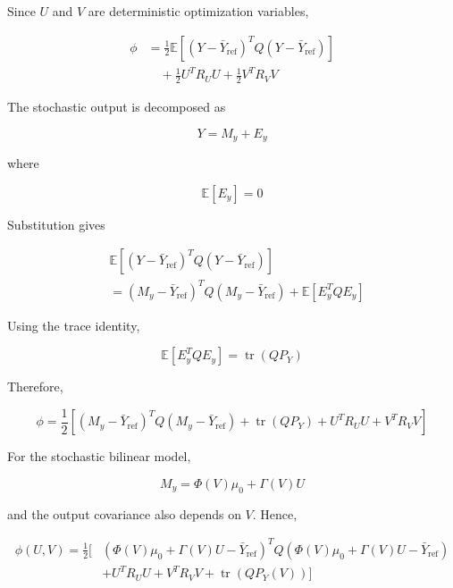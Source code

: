 Since \(U\) and \(V\) are deterministic optimization variables,

\begin{align}
    \phi
    &=
    \frac{1}{2}
    \mathbb{E}
    \left[
        (Y-\bar{Y}_{\mathrm{ref}})^T
        Q
        (Y-\bar{Y}_{\mathrm{ref}})
    \right]
    \nonumber\\
    &\quad+
    \frac{1}{2}U^TR_UU
    +
    \frac{1}{2}V^TR_VV
\end{align}

The stochastic output is decomposed as

\begin{equation}
    Y=M_y+E_y
\end{equation}

where

\begin{equation}
    \mathbb{E}[E_y]=0
\end{equation}

Substitution gives

\begin{align}
&\mathbb{E}
\left[
(Y-\bar{Y}_{\mathrm{ref}})^T
Q
(Y-\bar{Y}_{\mathrm{ref}})
\right]
\\
&=
(M_y-\bar{Y}_{\mathrm{ref}})^T
Q
(M_y-\bar{Y}_{\mathrm{ref}})
+
\mathbb{E}[E_y^TQE_y]
\end{align}

Using the trace identity,

\begin{equation}
    \mathbb{E}[E_y^TQE_y]
    =
    \operatorname{tr}
    \left(
        QP_Y
    \right)
\end{equation}

Therefore,

\begin{equation}
    \phi
    =
    \frac{1}{2}
    \left[
        (M_y-\bar{Y}_{\mathrm{ref}})^T
        Q
        (M_y-\bar{Y}_{\mathrm{ref}})
        +
        \operatorname{tr}(QP_Y)
        +
        U^TR_UU
        +
        V^TR_VV
    \right]
\end{equation}

For the stochastic bilinear model,

\begin{equation}
    M_y
    =
    \Phi(V)\mu_0+\Gamma(V)U
\end{equation}

and the output covariance also depends on \(V\). Hence,

\begin{equation}
\boxed{
\begin{aligned}
    \phi(U,V)
    =
    \frac{1}{2}
    \Big[
    &
    \left(
        \Phi(V)\mu_0
        +
        \Gamma(V)U
        -
        \bar{Y}_{\mathrm{ref}}
    \right)^T
    Q
    \left(
        \Phi(V)\mu_0
        +
        \Gamma(V)U
        -
        \bar{Y}_{\mathrm{ref}}
    \right)
    \\
    &+
    U^TR_UU
    +
    V^TR_VV
    +
    \operatorname{tr}
    \left(
        QP_Y(V)
    \right)
    \Big]
\end{aligned}
}
\label{eq:sb_cost_final}
\end{equation}

